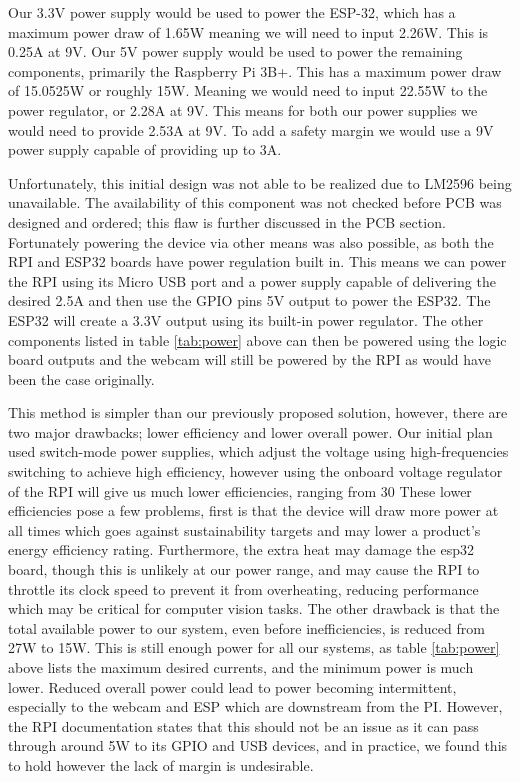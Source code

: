Our 3.3V power supply would be used to power the ESP-32, which has a maximum power draw of 1.65W meaning we will need to input 2.26W.
This is 0.25A at 9V.
Our 5V power supply would be used to power the remaining components, primarily the Raspberry Pi 3B+.
This has a maximum power draw of 15.0525W or roughly 15W.
Meaning we would need to input 22.55W to the power regulator, or 2.28A at 9V.
This means for both our power supplies we would need to provide 2.53A at 9V.
To add a safety margin we would use a 9V power supply capable of providing up to 3A.

Unfortunately, this initial design was not able to be realized due to LM2596 being unavailable.
The availability of this component was not checked before PCB was designed and ordered; this flaw is further discussed in the PCB section.
Fortunately powering the device via other means was also possible, as both the RPI and ESP32 boards have power regulation built in.
This means we can power the RPI using its Micro USB port and a power supply capable of delivering the desired 2.5A and then use the GPIO pins 5V output to power the ESP32.
The ESP32 will create a 3.3V output using its built-in power regulator.
The other components listed in table \ref{tab:power} above can then be powered using the logic board outputs and the webcam will still be powered by the RPI as would have been the case originally.

This method is simpler than our previously proposed solution, however, there are two major drawbacks; lower efficiency and lower overall power.
Our initial plan used switch-mode power supplies, which adjust the voltage using high-frequencies switching to achieve high efficiency, however using the onboard voltage regulator of the RPI will give us much lower efficiencies, ranging from 30%
These lower efficiencies pose a few problems, first is that the device will draw more power at all times which goes against sustainability targets and may lower a product's energy efficiency rating.
Furthermore, the extra heat may damage the esp32 board, though this is unlikely at our power range, and may cause the RPI to throttle its clock speed to prevent it from overheating, reducing performance which may be critical for computer vision tasks.
The other drawback is that the total available power to our system, even before inefficiencies, is reduced from 27W to 15W.
This is still enough power for all our systems, as table \ref{tab:power} above lists the maximum desired currents, and the minimum power is much lower.
Reduced overall power could lead to power becoming intermittent, especially to the webcam and ESP which are downstream from the PI.
However, the RPI documentation states that this should not be an issue as it can pass through around 5W to its GPIO and USB devices, and in practice, we found this to hold however the lack of margin is undesirable.

